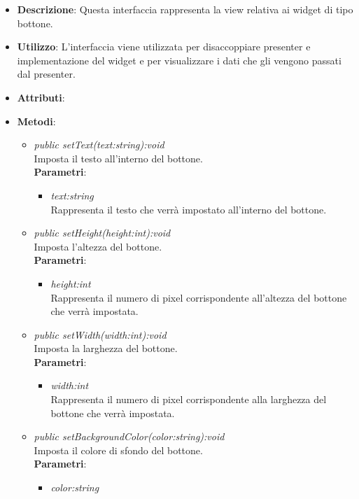 \begin{itemize}
\item \textbf{Descrizione}: Questa interfaccia rappresenta la view relativa ai widget di tipo bottone.
\item \textbf{Utilizzo}: L'interfaccia viene utilizzata per disaccoppiare presenter e implementazione del widget e per visualizzare i dati che gli vengono passati dal presenter.
\item \textbf{Attributi}:
\item \textbf{Metodi}:
	\begin{itemize}
	\item \textit{public setText(text:string):void}\\
	Imposta il testo all'interno del bottone.
		\\ \textbf{Parametri}: \begin{itemize}
		\item \textit{text:string}\\
		Rappresenta il testo che verrà impostato all'interno del bottone.
		\end{itemize}
	\item \textit{public setHeight(height:int):void}\\
	Imposta l'altezza del bottone.
		\\ \textbf{Parametri}: \begin{itemize}
		\item \textit{height:int}\\
		Rappresenta il numero di pixel corrispondente all'altezza del bottone che verrà impostata.
		\end{itemize}
	\item \textit{public setWidth(width:int):void}\\
	Imposta la larghezza del bottone.
		\\ \textbf{Parametri}: \begin{itemize}
		\item \textit{width:int}\\
		Rappresenta il numero di pixel corrispondente alla larghezza del bottone che verrà impostata.
		\end{itemize}
	\item \textit{public setBackgroundColor(color:string):void}\\
	Imposta il colore di sfondo del bottone.
		\\ \textbf{Parametri}: \begin{itemize}
		\item \textit{color:string}\\

\end{itemize}
\end{itemize}
\end{itemize}
